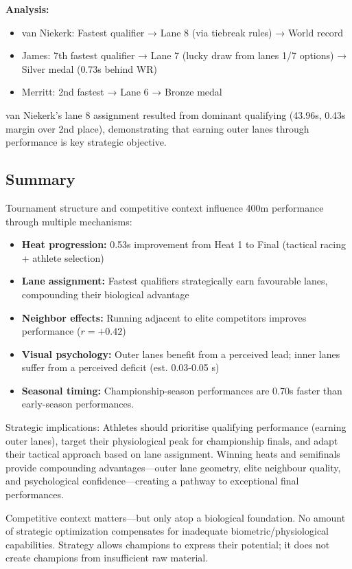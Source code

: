 \textbf{Analysis:}
\begin{itemize}
    \item van Niekerk: Fastest qualifier → Lane 8 (via tiebreak rules) → World record
    \item James: 7th fastest qualifier → Lane 7 (lucky draw from lanes 1/7 options) → Silver medal (0.73s behind WR)
    \item Merritt: 2nd fastest → Lane 6 → Bronze medal
\end{itemize}

van Niekerk's lane 8 assignment resulted from dominant qualifying (43.96s, 0.43s margin over 2nd place), demonstrating that earning outer lanes through performance is key strategic objective.

\subsection{Summary}

Tournament structure and competitive context influence 400m performance through multiple mechanisms:
\begin{itemize}
    \item \textbf{Heat progression:} 0.53s improvement from Heat 1 to Final (tactical racing + athlete selection)
    \item \textbf{Lane assignment:} Fastest qualifiers strategically earn favourable lanes, compounding their biological advantage
    \item \textbf{Neighbor effects:} Running adjacent to elite competitors improves performance ($r=+0.42$)
    \item \textbf{Visual psychology:} Outer lanes benefit from a perceived lead; inner lanes suffer from a perceived deficit (est. 0.03-0.05 s)
    \item \textbf{Seasonal timing:} Championship-season performances are 0.70s faster than early-season performances.
\end{itemize}

Strategic implications: Athletes should prioritise qualifying performance (earning outer lanes), target their physiological peak for championship finals, and adapt their tactical approach based on lane assignment. Winning heats and semifinals provide compounding advantages—outer lane geometry, elite neighbour quality, and psychological confidence—creating a pathway to exceptional final performances.

Competitive context matters—but only atop a biological foundation. No amount of strategic optimization compensates for inadequate biometric/physiological capabilities. Strategy allows champions to express their potential; it does not create champions from insufficient raw material.
